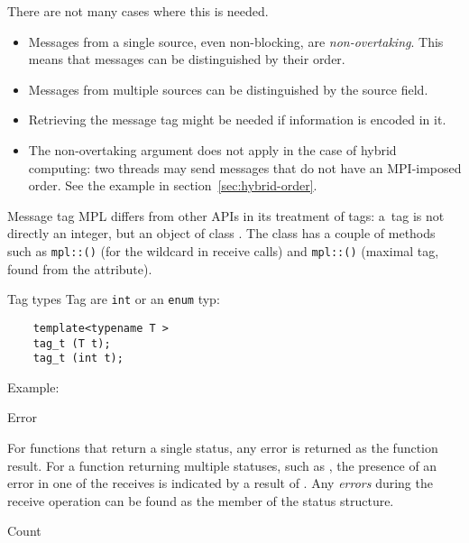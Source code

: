 There are not many cases where this is needed.
\begin{itemize}
\item Messages from a single source, even non-blocking,
  are \emph{non-overtaking}.
  This means that messages can be distinguished by their order.
\item Messages from multiple sources can be distinguished by the source field.
\item Retrieving the message tag might be needed if information is encoded in it.
\item The non-overtaking argument does not apply in the case of hybrid
  computing: two threads may send messages that do not have an MPI-imposed order.
  See the example in section~\ref{sec:hybrid-order}.
\end{itemize}

\begin{mplnote}{Message tag}
  \ac{MPL} differs from other \acp{API} in its treatment of tags:
  a~tag is not directly an integer, but an object of class .
  The  class has a couple of methods such as
  \lstinline+mpl::+\lstinline+()+
  (for the  wildcard in receive calls)
  and
  \lstinline+mpl::+\lstinline+()+
  (maximal tag, found from the  attribute).
\end{mplnote}

\begin{mplnote}{Tag types}
  Tag are \lstinline{int} or an \lstinline{enum} typ:
  \begin{lstlisting}
    template<typename T >
 	tag_t (T t);
 	tag_t (int t);
  \end{lstlisting}
  Example:
\end{mplnote}

 {Error}
\label{sec:mpi-status-error}

For functions that return a single status, any error is returned
as the function result.
For a function returning multiple statuses,
such as ,
the presence of an error in one of the receives
is indicated by a result of .
Any \emph{errors}
during the receive operation can be found as the
member of the status structure.


 {Count}
\label{sec:mpi-status-count}

